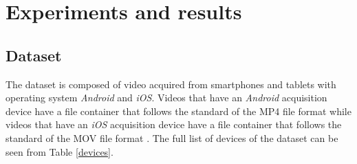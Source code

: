 \chapter{Experiments and results}

\section{Dataset}

The dataset is composed of video acquired from smartphones and tablets with operating system \emph{Android} and \emph{iOS}. 
Videos that have an \emph{Android} acquisition device have a file container that follows the standard of the MP4 \cite{mp4} file format while videos that have an \emph{iOS} acquisition device have a file container that follows the standard of the MOV file format \cite{mov}.
The full list of devices of the dataset can be seen from Table \ref{devices}. 


